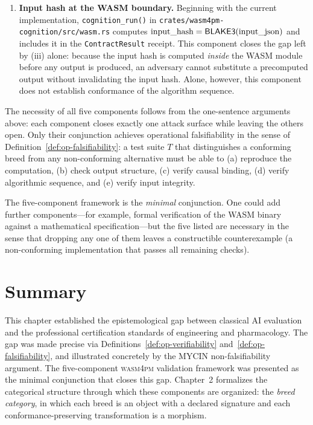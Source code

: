 \begin{enumerate}[label=(\roman*)]
\item \textbf{Input hash at the WASM boundary.}  Beginning with the current
implementation, \texttt{cognition\_run()} in
\texttt{crates/wasm4pm-cognition/src/wasm.rs} computes
$\text{input\_hash} = \mathsf{BLAKE3}(\text{input\_json})$ and includes it in the
\texttt{ContractResult} receipt.  This component closes the gap left by (iii)
alone: because the input hash is computed \emph{inside} the WASM module before
any output is produced, an adversary cannot substitute a precomputed output without
invalidating the input hash.  Alone, however, this component does not establish
conformance of the algorithm sequence.
\end{enumerate}

The necessity of all five components follows from the one-sentence arguments above:
each component closes exactly one attack surface while leaving the others open.
Only their conjunction achieves operational falsifiability in the sense of
Definition~\ref{def:op-falsifiability}: a test suite $T$ that distinguishes a
conforming breed from any non-conforming alternative must be able to (a) reproduce
the computation, (b) check output structure, (c) verify causal binding, (d) verify
algorithmic sequence, and (e) verify input integrity.

\begin{remark}
The five-component framework is the \emph{minimal} conjunction.  One could add
further components—for example, formal verification of the WASM binary against a
mathematical specification—but the five listed are necessary in the sense that
dropping any one of them leaves a constructible counterexample (a non-conforming
implementation that passes all remaining checks).
\end{remark}

\section{Summary}
\label{sec:ch1-summary}

This chapter established the epistemological gap between classical AI evaluation
and the professional certification standards of engineering and pharmacology.  The
gap was made precise via Definitions~\ref{def:op-verifiability}
and~\ref{def:op-falsifiability}, and illustrated concretely by the MYCIN
non-falsifiability argument.  The five-component \textsc{wasm4pm} validation
framework was presented as the minimal conjunction that closes this gap.  Chapter~2
formalizes the categorical structure through which these components are organized:
the \emph{breed category}, in which each breed is an object with a declared
signature and each conformance-preserving transformation is a morphism.
